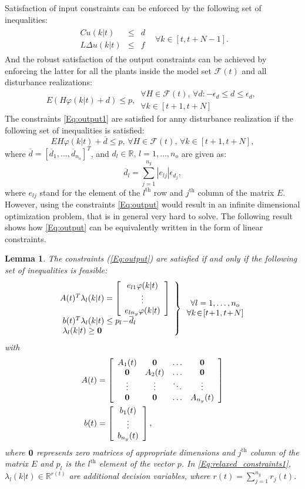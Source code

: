 \documentclass[10 pt, letterpaper]{article}
\newcommand{\beq}{\begin{equation}}
\newcommand{\eeq}{\end{equation}}
\newcommand{\ba}{\begin{array}}
\newcommand{\ea}{\end{array}}
\newcommand{\bR}{{\mathbb R}}
\newtheorem{lemma}{Lemma}[section]
\begin{document}
Satisfaction of input constraints can be enforced by the following set of inequalities:
\beq\label{Eq:input_rate}
\ba{ll}
\begin{aligned}
C u(k|t) & \leq & d\\
L \Delta u(k|t) & \leq & f
\end{aligned} & \forall k\in[t,t+N-1].
\ea
\eeq
And the robust satisfaction of the output constraints can be achieved by enforcing the latter for all the plants inside the model set $\mathcal{F}(t)$ and all disturbance realizations:
\beq\label{Eq:output1}
E(H\varphi(k|t)\!+\!d)\leq p, \, \ba{l}\forall H\! \in\! \mathcal{F}(t),\, \forall d: -\epsilon_d\leq d\leq \epsilon_d,\\ \forall k\in[t\!+\!1,t\!+\!N] \ea
\eeq
The constraints \eqref{Eq:output1} are satisfied for anny disturbance realization if the following set of inequalities is satisfied: 
\beq\label{Eq:output}
EH\varphi(k|t)\!+\!\overline{d}\leq p, \, \forall H\! \in\! \mathcal{F}(t),\, \forall k\in[t\!+\!1,t\!+\!N],
\eeq
where $\overline{d}=[\overline{d}_1,\hdots, \overline{d}_{n_o}]^T$, and $d_l \in \bR,\, l=1,\hdots, n_o$ are given as:
\beq\label{Eq:iter_LP}
\overline{d}_l=\sum\limits_{j=1}^{n_y}|e_{lj}|\epsilon_{d_j},
\eeq
where $e_{lj}$ stand for the element of the $l^\text{th}$ row and $j^\text{th}$ column of the matrix $E$. However, using the constraints \eqref{Eq:output} would result in an infinite dimensional optimization problem, that is in general very hard to solve. The following result shows how \eqref{Eq:output} can be equivalently written in the form of linear constraints.
\begin{lemma}\label{L:constraint_equivalence_1}
The constraints (\ref{Eq:output}) are satisfied if and only if the following set of inequalities is feasible:
\small
\beq\label{Eq:relaxed_constraints1}
\left.\ba{l}\!\!
A(t)^T\lambda_l(k|t)=\left[\ba{c}
e_{l1}\varphi(k|t)\\
\vdots\\
e_{ln_y}\varphi(k|t)
\ea\right]\\
b(t)^T\lambda_l(k|t)\leq p_l\!-\!\overline{d}_l\\
\lambda_l(k|t)\geq \bold 0
\ea \right\}\ba{cc}\forall l=1,\hdots,n_o\\
\forall k\!\in\![t\!+\!1,t\!+\!N]\ea
\eeq
\normalsize
with
\small
\beq\label{Eq:explanation}
\begin{aligned}
A(t)&=\left[\ba{cccc} A_1(t)& \bold 0& \ldots&\bold 0\\
\bold 0& A_2(t)& \ldots& \bold 0\\
\vdots& \vdots & \ddots & \vdots \\
\bold 0&\bold 0& \ldots&A_{n_y}(t)\ea \right]\\
b(t)&=\left[\ba{c}
b_1(t)\\
\vdots\\
b_{n_y}(t)
\ea \right],
\end{aligned}
\eeq
\normalsize
where $\bold 0$ represents zero matrices of appropriate dimensions and $j^\text{th}$ column of the matrix $E$ and $p_l$ is the $l^\text{th}$ element of the vector $p$. In \eqref{Eq:relaxed_constraints1}, $\lambda_l(k|t) \in \bR^{r(t)}$ are additional decision variables, where $r(t)=\sum_{j=1}^{n_y} r_j(t)$.
\end{lemma}
\end{document}
